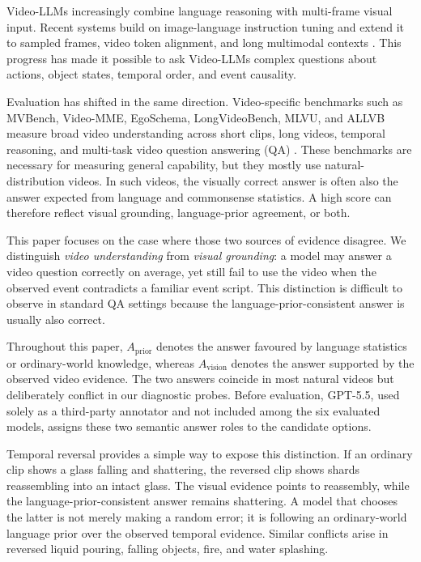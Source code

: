 \documentclass[final,5p,times,twocolumn]{elsarticle}
\newcommand{\Aprior}{A_{\mathrm{prior}}}
\newcommand{\Avision}{A_{\mathrm{vision}}}
\begin{document}
Video-LLMs increasingly combine language
reasoning with multi-frame visual input. Recent systems build on image-language
instruction tuning and extend it to sampled frames, video token alignment, and
long multimodal contexts
\cite{alayrac2022flamingo,li2023blip,liu2023visual,liu2024llavanext,maaz2024video,lin2024video,wang2024qwen2,team2024gemini,hurst2024gpt}.
This progress has made it possible to ask Video-LLMs complex questions about
actions, object states, temporal order, and event causality.

Evaluation has shifted in the same direction. Video-specific benchmarks such as
MVBench, Video-MME, EgoSchema, LongVideoBench, MLVU, and ALLVB measure broad
video understanding across short clips, long videos, temporal reasoning, and
multi-task video question answering (QA)
\cite{li2024mvbench,fu2025video,mangalam2023egoschema,wu2024longvideobench,zhou2025mlvu,tan2025allvb}.
These benchmarks are necessary for measuring general capability, but they
mostly use natural-distribution videos. In such videos, the visually correct
answer is often also the answer expected from language and commonsense
statistics. A high score can therefore reflect visual grounding, language-prior
agreement, or both.

This paper focuses on the case where those two sources of evidence disagree.
We distinguish \emph{video understanding} from \emph{visual grounding}: a model
may answer a video question correctly on average, yet still fail to use the
video when the observed event contradicts a familiar event script. This
distinction is difficult to observe in standard QA settings because the
language-prior-consistent answer is usually also correct.

Throughout this paper, $\Aprior$ denotes the answer favoured by language
statistics or ordinary-world knowledge, whereas $\Avision$ denotes the answer
supported by the observed video evidence. The two answers coincide in most
natural videos but deliberately conflict in our diagnostic probes.
Before evaluation, GPT-5.5, used solely as a third-party annotator and not
included among the six evaluated models, assigns these two semantic answer
roles to the candidate options.

Temporal reversal provides a simple way to expose this distinction. If an
ordinary clip shows a glass falling and shattering, the reversed clip shows
shards reassembling into an intact glass. The visual evidence points to
reassembly, while the language-prior-consistent answer remains shattering. A
model that chooses the latter is not merely making a random error; it is
following an ordinary-world language prior over the observed temporal
evidence. Similar
conflicts arise in reversed liquid pouring, falling objects, fire, and water
splashing.
\end{document}
